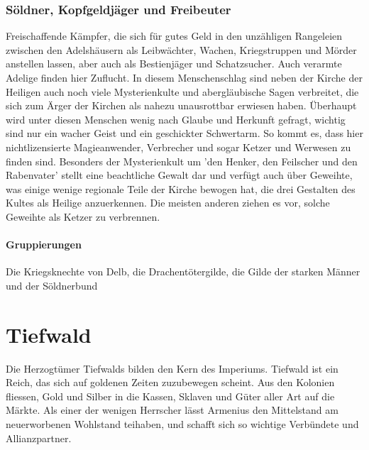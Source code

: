 \documentclass[12pt,twoside,twocolumn,openany]{book}
\begin{document}

\subsubsection{Söldner, Kopfgeldjäger und Freibeuter} Freischaffende Kämpfer, die sich für gutes Geld in den unzähligen Rangeleien zwischen den Adelshäusern als Leibwächter, Wachen, Kriegstruppen und Mörder anstellen lassen, aber auch als Bestienjäger und Schatzsucher. Auch verarmte Adelige finden hier Zuflucht. In diesem Menschenschlag sind neben der Kirche der Heiligen auch noch viele Mysterienkulte und abergläubische Sagen verbreitet, die sich zum Ärger der Kirchen als nahezu unausrottbar erwiesen haben. Überhaupt wird unter diesen Menschen wenig nach Glaube und Herkunft gefragt, wichtig sind nur ein wacher Geist und ein geschickter Schwertarm. So kommt es, dass hier nichtlizensierte Magieanwender, Verbrecher und sogar Ketzer und Werwesen zu finden sind.
Besonders der Mysterienkult um 'den Henker, den Feilscher und den Rabenvater' stellt eine beachtliche Gewalt dar und verfügt auch über Geweihte, was einige wenige regionale Teile der Kirche bewogen hat, die drei Gestalten des Kultes als Heilige anzuerkennen. Die meisten anderen ziehen es vor, solche Geweihte als Ketzer zu verbrennen.

\paragraph{Gruppierungen} Die Kriegsknechte von Delb, die Drachentötergilde, die Gilde der starken Männer und der Söldnerbund

\section{Tiefwald}
Die Herzogtümer Tiefwalds bilden den Kern des Imperiums. Tiefwald ist ein Reich, das sich auf goldenen Zeiten zuzubewegen scheint. Aus den Kolonien fliessen, Gold und Silber in die Kassen, Sklaven und Güter aller Art auf die Märkte. Als einer der wenigen Herrscher lässt Armenius den Mittelstand am neuerworbenen Wohlstand teihaben, und schafft sich so wichtige Verbündete und Allianzpartner.
\end{document}
